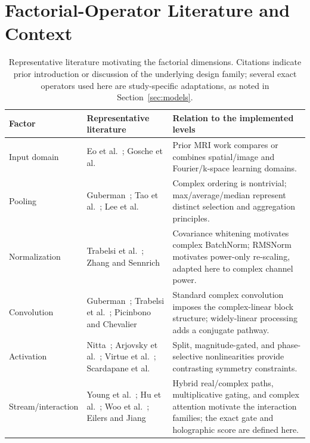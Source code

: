 \section{Factorial-Operator Literature and Context}

\begin{table}[t]
\centering
\caption{Representative literature motivating the factorial dimensions. Citations indicate prior introduction or discussion of the underlying design family; several exact operators used here are study-specific adaptations, as noted in Section~\ref{sec:models}.}
\label{tab:factor-literature}
\scriptsize
\begin{tabularx}{\textwidth}{L{2.2cm}L{5.0cm}X}
\toprule
Factor & Representative literature & Relation to the implemented levels \\
\midrule
Input domain & Eo et al.~\cite{Eo2018KIKINet}; Gosche et al.~\cite{Gosche2024DomainInfluence} & Prior MRI work compares or combines spatial/image and Fourier/k-space learning domains. \\
Pooling & Guberman~\cite{Guberman2016ComplexCNN}; Tao et al.~\cite{Tao2022Pooling}; Lee et al.~\cite{Lee2022CVNNSurvey} & Complex ordering is nontrivial; max/average/median represent distinct selection and aggregation principles. \\
Normalization & Trabelsi et al.~\cite{Trabelsi2018DeepComplex}; Zhang and Sennrich~\cite{Zhang2019RMSNorm} & Covariance whitening motivates complex BatchNorm; RMSNorm motivates power-only re-scaling, adapted here to complex channel power. \\
Convolution & Guberman~\cite{Guberman2016ComplexCNN}; Trabelsi et al.~\cite{Trabelsi2018DeepComplex}; Picinbono and Chevalier~\cite{Picinbono1995WidelyLinear} & Standard complex convolution imposes the complex-linear block structure; widely-linear processing adds a conjugate pathway. \\
Activation & Nitta~\cite{Nitta1997ComplexBP}; Arjovsky et al.~\cite{Arjovsky2016Unitary}; Virtue et al.~\cite{Virtue2017ComplexActivation}; Scardapane et al.~\cite{Scardapane2020ComplexActivations} & Split, magnitude-gated, and phase-selective nonlinearities provide contrasting symmetry constraints. \\
Stream/interaction & Young et al.~\cite{Young2026Hybrid}; Hu et al.~\cite{Hu2018SENet}; Woo et al.~\cite{Woo2018CBAM}; Eilers and Jiang~\cite{Eilers2023ComplexTransformer} & Hybrid real/complex paths, multiplicative gating, and complex attention motivate the interaction families; the exact gate and holographic score are defined here. \\
\bottomrule
\end{tabularx}
\end{table}

